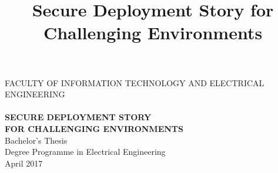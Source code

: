 \documentclass[a4paper,12pt,titlepage]{dithesis}
\title{Secure Deployment Story for Challenging Environments}
\begin{document}
\begin{titlepage}
	{{\small FACULTY OF INFORMATION TECHNOLOGY AND ELECTRICAL ENGINEERING}\\}
	\vspace{65 mm}
	{\textbf{\LARGE \getfirstname\ \getlastname}\\}
	\vspace{15 mm}
	{\textbf{\LARGE SECURE DEPLOYMENT STORY\\FOR CHALLENGING ENVIRONMENTS\\}}
	\vspace{70 mm}
	{\large {Bachelor's Thesis}\\}
	{\large {Degree Programme in Electrical Engineering}\\}
	{\large {April 2017}\\}
\end{titlepage}

\end{document}
